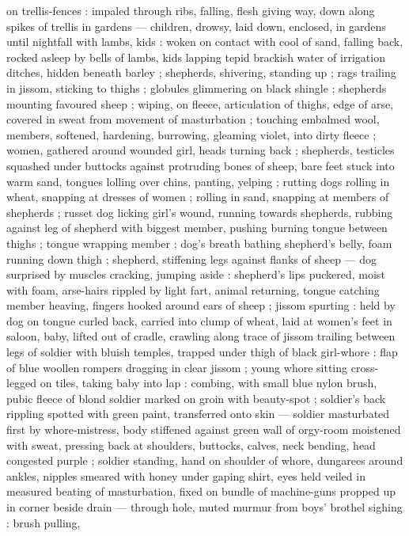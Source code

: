 on trellis-fences : impaled through ribs, falling, flesh giving way, down along spikes of trellis in
gardens --- children, drowsy, laid down, enclosed, in gardens until nightfall with lambs, kids :
woken on contact with cool of sand, falling back, rocked asleep by bells of lambs, kids lapping
tepid brackish water of irrigation ditches, hidden beneath barley ; shepherds, shivering, standing
up ; rags trailing in jissom, sticking to thighs ; globules glimmering on black shingle ; shepherds
mounting favoured sheep ; wiping, on fleece, articulation of thighs, edge of arse, covered in sweat
from movement of masturbation ; touching embalmed wool, members, softened, hardening, burrowing,
gleaming violet, into dirty fleece ; women, gathered around wounded girl, heads turning back ;
shepherds, testicles squashed under buttocks against protruding bones of sheep, bare feet stuck into
warm sand, tongues lolling over chins, panting, yelping ; rutting dogs rolling in wheat, snapping at
dresses of women ; rolling in sand, snapping at members of shepherds ; russet dog licking girl's
wound, running towards shepherds, rubbing %
against leg of shepherd with biggest member, pushing burning tongue between thighs ; tongue wrapping
member ; dog's breath bathing shepherd's belly, foam running down thigh ; shepherd, stiffening legs
against flanks of sheep --- dog surprised by muscles cracking, jumping aside : shepherd's lips
puckered, moist with foam, arse-hairs rippled by light fart, animal returning, tongue catching
member {\dashcom} heaving, fingers hooked around ears of sheep ; jissom spurting : held by dog on
tongue curled back, carried into clump of wheat, laid at women's feet {\semislash} in saloon, baby,
lifted out of cradle, crawling along trace of jissom trailing between legs of soldier with bluish
temples, trapped under thigh of black girl-whore : flap of blue woollen rompers dragging in clear
jissom ; young whore sitting cross-legged on tiles, taking baby into lap : combing, with small blue
nylon brush, pubic fleece of blond soldier marked on groin with beauty-spot ; soldier's back
rippling spotted with green paint, transferred onto skin --- soldier masturbated first by
whore-mistress, body stiffened against green wall of orgy-room moistened with sweat, pressing back
at shoulders, buttocks, calves, neck bending, head congested purple ; soldier standing, hand on
shoulder of whore, dungarees around ankles, nipples smeared with honey under gaping shirt, eyes held
veiled in measured beating of masturbation, fixed on bundle of machine-guns propped up in corner
beside drain --- through hole, muted murmur from boys' brothel {\dashcom} sighing : brush pulling,
